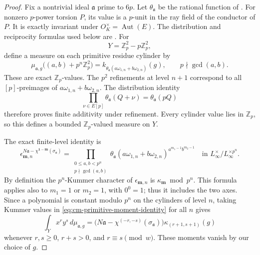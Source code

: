 \documentclass[11pt]{article}
\theoremstyle{definition}\newtheorem{definition}[theorem]{Definition}
\begin{document}
\begin{proof}
Fix a nontrivial ideal \(\mathfrak a\) prime to \(6p\).
Let \(\theta_{\mathfrak a}\) be the rational function of
\cite[Definition 2.1, p.~7]{IshiiSoule}.
For nonzero \(p\)-power torsion \(P\), its value is a \(p\)-unit
in the ray field of the conductor of \(P\).
It is exactly invariant under \(O_K^\times=\operatorname{Aut}(E)\).
The distribution and reciprocity formulas used below are
\cite[Propositions 2.1--2.2, p.~7]{IshiiSoule}.
For
\[
             Y=\mathbb Z_p^2-p\mathbb Z_p^2,
\]
define a measure on each primitive residue cylinder by
\begin{equation}\label{eq:cm-cylinder-kummer}
 \mu_{\mathfrak a,g}\bigl((a,b)+p^n\mathbb Z_p^2\bigr)
   =k_{\theta_{\mathfrak a}(a\omega_{1,n}+b\omega_{2,n})}(g),
 \qquad p\nmid\gcd(a,b).
\end{equation}
These are exact \(\mathbb Z_p\)-values.
The \(p^2\) refinements at level \(n+1\) correspond to all
\([p]\)-preimages of \(a\omega_{1,n}+b\omega_{2,n}\).
The distribution identity
\[
  \prod_{\nu\in E[p]}\theta_{\mathfrak a}(Q+\nu)
                       =\theta_{\mathfrak a}(pQ)
\]
therefore proves finite additivity under refinement.
Every cylinder value lies in \(\mathbb Z_p\), so this defines a bounded
\(\mathbb Z_p\)-valued measure on \(Y\).

The exact finite-level identity
\cite[Lemma 3.1, p.~11]{IshiiSoule} is
\begin{equation}\label{eq:cm-primitive-moment-identity}
 \epsilon_{\boldsymbol m,n}^{
       N\mathfrak a-\chi^{\boldsymbol1-\boldsymbol m}
                                      (\sigma_{\mathfrak a})}
 =\prod_{\substack{0\leq a,b<p^n\\p\nmid\gcd(a,b)}}
 \theta_{\mathfrak a}(a\omega_{1,n}+b\omega_{2,n})^{
                            a^{m_1-1}b^{m_2-1}}
 \quad\text{in }L_\infty^\times/L_\infty^{\times p^n}.
\end{equation}
By definition the \(p^n\)-Kummer character of
\(\epsilon_{\boldsymbol m,n}\) is
\(\kappa_{\boldsymbol m}\bmod p^n\).
This formula applies also to \(m_1=1\) or \(m_2=1\), with
\(0^0=1\); thus it includes the two axes.
Since a polynomial is constant modulo \(p^n\) on the cylinders
of level \(n\), taking Kummer values in
\eqref{eq:cm-primitive-moment-identity} for all \(n\) gives
\begin{equation}\label{eq:cm-primitive-moment-value}
 \int_Y x^r y^s\,d\mu_{\mathfrak a,g}
 =\bigl(N\mathfrak a-\chi^{(-r,-s)}
                          (\sigma_{\mathfrak a})\bigr)
                  \kappa_{(r+1,s+1)}(g)
\end{equation}
whenever \(r,s\geq0\), \(r+s>0\), and \(r\equiv s\pmod w\).
These moments vanish by our choice of \(g\).


\end{proof}
\end{document}
